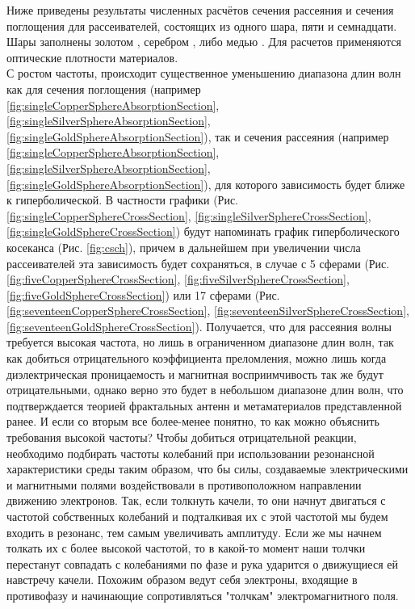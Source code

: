 Ниже приведены результаты численных расчётов сечения рассеяния и сечения поглощения для рассеивателей, состоящих из одного шара, пяти и семнадцати. Шары заполнены золотом \cite{Olmon2012}, серебром \cite{Yang2015}, либо медью \cite{Querry1985}. Для расчетов применяются оптические плотности материалов.\\
С ростом частоты, происходит существенное уменьшению диапазона длин волн как для сечения поглощения (например \ref{fig:singleCopperSphereAbsorptionSection},  \ref{fig:singleSilverSphereAbsorptionSection}, \ref{fig:singleGoldSphereAbsorptionSection}), так и сечения рассеяния (например \ref{fig:singleCopperSphereAbsorptionSection}, \ref{fig:singleSilverSphereAbsorptionSection}, \ref{fig:singleGoldSphereAbsorptionSection}), для которого зависимость будет ближе к гиперболической. В частности графики (Рис. \ref{fig:singleCopperSphereCrossSection}, \ref{fig:singleSilverSphereCrossSection}, \ref{fig:singleGoldSphereCrossSection}) будут напоминать график гиперболического косеканса (Рис. \ref{fig:csch}), причем в дальнейшем при увеличении числа рассеивателей эта зависимость будет сохраняться, в случае с 5 сферами (Рис. \ref{fig:fiveCopperSphereCrossSection}, \ref{fig:fiveSilverSphereCrossSection}, \ref{fig:fiveGoldSphereCrossSection}) или 17 сферами (Рис. \ref{fig:seventeenCopperSphereCrossSection}, \ref{fig:seventeenSilverSphereCrossSection}, \ref{fig:seventeenGoldSphereCrossSection}). Получается, что для рассеяния волны требуется высокая частота, но лишь в ограниченном диапазоне длин волн, так как добиться отрицательного коэффициента преломления, можно лишь когда диэлектрическая проницаемость и магнитная восприимчивость так же будут отрицательными, однако верно это будет в небольшом диапазоне длин волн, что подтверждается теорией фрактальных антенн и метаматериалов представленной ранее. И если со вторым все более-менее понятно, то как можно объяснить требования высокой частоты? Чтобы добиться отрицательной реакции, необходимо подбирать частоты колебаний при использовании резонансной характеристики среды таким образом, что бы силы, создаваемые электрическими и магнитными полями воздействовали в противоположном направлении движению электронов. Так, если толкнуть качели, то они начнут двигаться с частотой собственных колебаний и подталкивая их с этой частотой мы будем входить в резонанс, тем самым увеличивать амплитуду. Если же мы начнем толкать их с более высокой частотой, то в какой-то момент наши толчки перестанут совпадать с колебаниями по фазе и рука ударится о движущиеся ей навстречу качели. Похожим образом ведут себя электроны, входящие в противофазу и начинающие сопротивляться "толчкам" электромагнитного поля.
